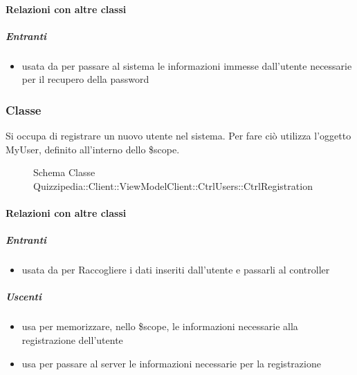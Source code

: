\paragraph{Relazioni con altre classi}
\subparagraph{Entranti}
\begin{itemize}
\item usata da  per passare al sistema le informazioni immesse dall'utente necessarie per il recupero della password
\end{itemize}
\subsubsection{Classe }
Si occupa di registrare un nuovo utente nel sistema. Per fare ciò utilizza l'oggetto MyUser, definito all'interno dello \$scope.
\begin{figure}[H]
\centering
\noindent{}
\caption[Schema Classe CtrlRegistration]{Schema Classe Quizzipedia::Client::ViewModelClient::CtrlUsers::CtrlRegistration}
\end{figure}
\paragraph{Relazioni con altre classi}
\subparagraph{Entranti}
\begin{itemize}
\item usata da  per Raccogliere i dati inseriti dall'utente e passarli al controller
\end{itemize}
\subparagraph{Uscenti}
\begin{itemize}
\item usa  per memorizzare, nello \$scope, le informazioni necessarie alla registrazione dell'utente
\item usa  per passare al server le informazioni necessarie per la registrazione
\end{itemize}
